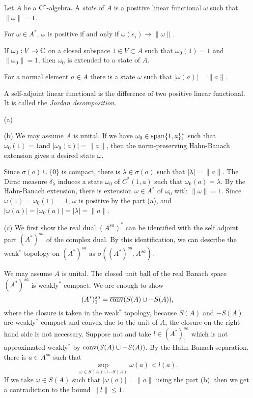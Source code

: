 \documentclass{../../large}
\begin{document}
\begin{prb}
Let $A$ be a C$^*$-algebra.
A \emph{state} of $A$ is a positive linear functional $\omega$ such that $\|\omega\|=1$.
\begin{parts}
\item For $\omega\in A^*$, $\omega$ is positive if and only if $\omega(e_i)\to\|\omega\|$.
\item If $\omega_0:V\to\mathbb{C}$ on a closed subspace $1\in V\subset A$ such that $\omega_0(1)=1$ and $\|\omega_0\|=1$, then $\omega_0$ is extended to a state of $A$.
\item For a normal element $a\in A$ there is a state $\omega$ such that $|\omega(a)|=\|a\|$.
\item A self-adjoint linear functional is the difference of two positive linear functional. It is called the \emph{Jordan decomposition}.
\end{parts}
\end{prb}
\begin{pf}
(a)


(b)
We may assume $A$ is unital.
If we have $\omega_0\in\operatorname{span}\{1,a\}^*_1$ such that $\omega_0(1)=1$and $|\omega_0(a)|=\|a\|$, then the norm-preserving Hahn-Banach extension gives a desired state $\omega$.

Since $\sigma(a)\cup\{0\}$ is compact, there is $\lambda\in\sigma(a)$ such that $|\lambda|=\|a\|$.
The Dirac measure $\delta_\lambda$ induces a state $\omega_0$ of $C^*(1,a)$ such that $\omega_0(a)=\lambda$.
By the Hahn-Banach extension, there is extension $\omega\in A^*$ of $\omega_0$ with $\|\omega\|=1$.
Since $\omega(1)=\omega_0(1)=1$, $\omega$ is positive by the part (a), and $|\omega(a)|=|\omega_0(a)|=|\lambda|=\|a\|$.

(c)
We first show the real dual $(A^{sa})^*$ can be identified with the self adjoint part $(A^*)^{sa}$ of the complex dual.
By this identification, we can describe the weak$^*$ topology on $(A^*)^{sa}$ as $\sigma((A^*)^{sa},A^{sa})$.

We may assume $A$ is unital.
The closed unit ball of the real Banach space $(A^*)^{sa}$ is weakly$^*$ compact.
We are enough to show
\[(A^*)^{sa}_1=\overline{\operatorname{conv}}(S(A)\cup-S(A)),\]
where the closure is taken in the weak$^*$ topology, because $S(A)$ and $-S(A)$ are weakly$^*$ compact and convex due to the unit of $A$, the closure on the right-hand side is not necessary.
Suppose not and take $l\in(A^*)^{sa}_1$ which is not approximated weakly$^*$ by $\operatorname{conv}(S(A)\cup-S(A))$.
By the Hahn-Banach separation, there is $a\in A^{sa}$ such that
\[\sup_{\omega\in S(A)\cup-S(A)}\omega(a)<l(a).\]
If we take $\omega\in S(A)$ such that $|\omega(a)|=\|a\|$ using the part (b), then we get a contradiction to the bound $\|l\|\le1$.


\end{pf}
\end{document}
